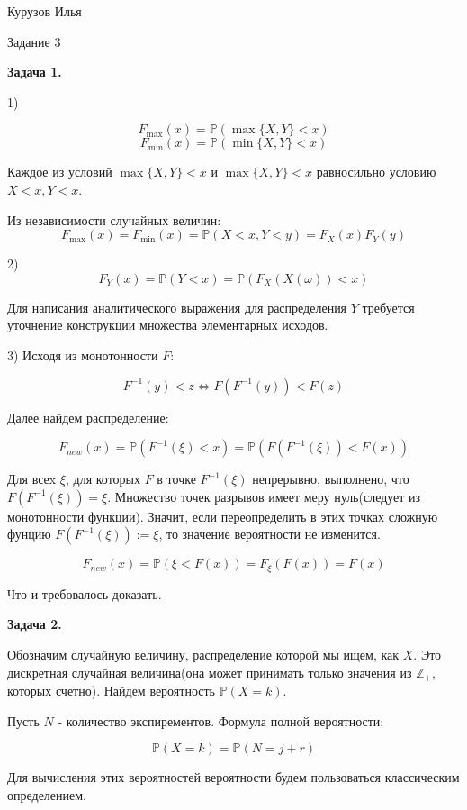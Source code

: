 \documentclass[12pt]{article}
\begin{document}
\begin{center}
{Курузов Илья}

{Задание 3}
\end{center}

\begin{center}
\textbf{Задача 1.}
\end{center}

1)

$$F_{\max}(x) = \mathbb{P}(\max\{X,Y\}<x)$$
$$F_{\min}(x) = \mathbb{P}(\min\{X,Y\}<x)$$

Каждое из условий $\max\{X,Y\}<x$ и $\max\{X,Y\}<x$ равносильно условию $X<x, Y<x$.

Из независимости случайных величин:
$$F_{\max}(x)=F_{\min}(x) = \mathbb{P}(X<x, Y<y) = F_X(x)F_Y(y)$$

2) $$F_Y(x) = \mathbb{P}(Y < x)=\mathbb{P}(F_X(X(\omega)) < x)$$

Для написания аналитического выражения для распределения $Y$ требуется уточнение конструкции множества элементарных исходов.

3) Исходя из монотонности $F$:

$$F^{-1}(y) < z \Leftrightarrow F(F^{-1}(y)) < F(z)$$

Далее найдем распределение:

$$F_{new}(x) = \mathbb{P}(F^{-1}(\xi)<x)=\mathbb{P}(F(F^{-1}(\xi))<F(x))$$

Для всеx $\xi$, для которых $F$ в точке $F^{-1}(\xi)$ непрерывно, выполнено, что $F(F^{-1}(\xi)) = \xi$. Множество точек разрывов имеет меру нуль(следует из монотонности функции). Значит, если переопределить в этих точках сложную фунцию $F(F^{-1}(\xi)):=\xi$, то значение вероятности не изменится.

$$F_{new}(x) = \mathbb{P}(\xi<F(x)) = F_{\xi}(F(x))=F(x)$$

Что и требовалось доказать.

\begin{center}
\textbf{Задача 2.}
\end{center}

Обозначим случайную величину, распределение которой мы ищем, как $X$. Это дискретная случайная величина(она может принимать только значения из $\mathbb{Z}_+$, которых счетно). Найдем вероятность $\mathbb{P}(X = k)$.

Пусть $N$ -  количество экспирементов. Формула полной вероятности:

$$\mathbb{P}(X = k) = \mathbb{P}(N=j+r)$$

Для вычисления этих вероятностей вероятности будем пользоваться классическим определением.
\end{document}
